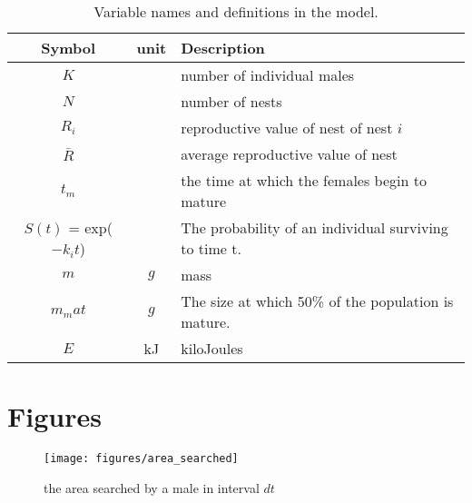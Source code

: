 \documentclass[a4paper,11pt]{article}
\begin{document}
\begin{table}[h!]
    \caption{Variable names and definitions in the model.}
    \centering
    \begin{tabular}{c | c | l }
        \hline
        Symbol & unit & Description\\
        \hline
        \hline
        $K$ & & number of individual males \\
        $N$ & & number of nests \\
        $R_i$ & & reproductive value of nest of nest $i$\\
        $\bar{R}$ & & average reproductive value of nest\\
        \hline
        $t_m$ & & the time at which the females begin to mature\\
        $S(t)$ = exp($-k_it$) & & The probability of an individual surviving to time t.\\
        \hline
        $m$ & $g$ & mass\\
        $m_mat$ & $g$ & The size at which 50\% of the population is mature.\\
        $E$ & kJ & kiloJoules\\
        \hline
    \end{tabular}
\end{table}

\section{Figures}

\begin{figure}[h!]
\centering
\texttt{[image: figures/area\_searched]}
\caption{the area searched by a male in interval $dt$}
\label{fig:area searched figure}
\end{figure}
\clearpage


\end{document}
